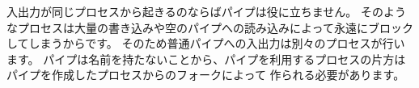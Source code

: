 入出力が同じプロセスから起きるのならばパイプは役に立ちません。
そのようなプロセスは大量の書き込みや空のパイプへの読み込みによって永遠にブロックしてしまうからです。
そのため普通パイプへの入出力は別々のプロセスが行います。
パイプは名前を持たないことから、パイプを利用するプロセスの片方はパイプを作成したプロセスからのフォークによって
作られる必要があります。
